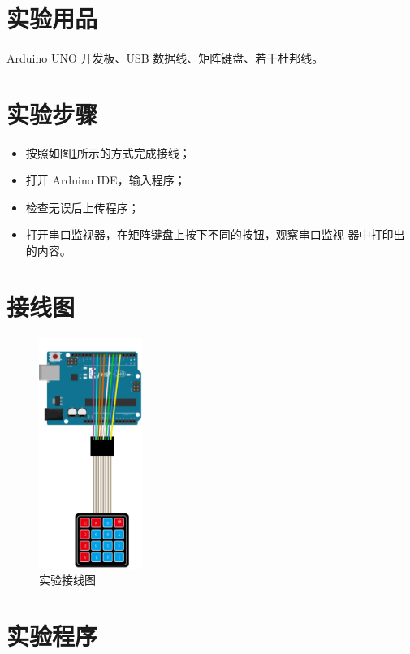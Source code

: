 \documentclass[UTF8, oneside]{ctexbook}
\begin{document}
\section{实验用品}
\paragraph{}
Arduino UNO 开发板、USB 数据线、矩阵键盘、若干杜邦线。

\section{实验步骤}
\begin{itemize}
    \item[(1)] 按照如图\ref{b5_line}所示的方式完成接线；
    \item[(2)] 打开 Arduino IDE，输入程序；
    \item[(3)] 检查无误后上传程序；
    \item[(4)] 打开串口监视器，在矩阵键盘上按下不同的按钮，观察串口监视
    器中打印出的内容。    
\end{itemize}

\section{接线图}
\begin{figure}[h]
    \centering
    \includegraphics[width=0.3\textwidth]{./result/basic/5/lines.png}
    \caption{实验接线图}
    \label{b5_line}
\end{figure}

\section{实验程序}
\end{document}
